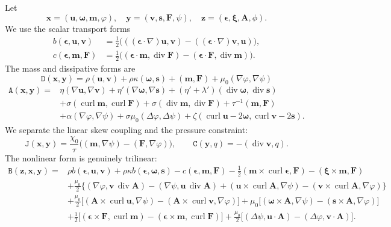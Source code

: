 \documentclass[11pt,a4paper]{article}
\newcommand{\bs}{\boldsymbol}
\DeclareMathOperator{\curl}{curl}
\DeclareMathOperator{\ddiv}{div}
\newcommand{\Div}{\ddiv}
\newcommand{\DD}{\mathtt D}
\newcommand{\Aform}{\mathtt A}
\newcommand{\JJ}{\mathtt J}
\newcommand{\BB}{\mathtt B}
\newcommand{\CC}{\mathtt C}
\theoremstyle{definition}
\numberwithin{equation}{section}
\begin{document}
Let
\[
 \bs x=(\bs u,\bs\omega,\bs m,\varphi),\quad
 \bs y=(\bs v,\bs s,\bs F,\psi),\quad
 \bs z=(\bs\epsilon,\bs \xi,\bs A,\phi).
\]
We use the scalar transport forms
\begin{align}
 b(\bs\epsilon,\bs u,\bs v)
 &=\frac12\bigl(((\bs\epsilon\cdot\nabla)\bs u,\bs v)
                  -((\bs\epsilon\cdot\nabla)\bs v,\bs u)\bigr),\label{eq:b}\\
 c(\bs\epsilon,\bs m,\bs F)
 &=\frac12\bigl((\bs\epsilon\cdot\bs m,\Div\bs F)
                  -(\bs\epsilon\cdot\bs F,\Div\bs m)\bigr).\label{eq:c}
\end{align}
The mass and dissipative forms are
%
\begin{equation}\label{eq:D}
 \DD(\bs x,\bs y)=\rho(\bs u,\bs v)+\rho\kappa(\bs\omega,\bs s)
 +(\bs m,\bs F)+\mu_0(\nabla\varphi,\nabla\psi)
\end{equation}
\begin{equation}\label{eq:A}
\begin{aligned}
 \Aform(\bs x,\bs y)={}&\eta(\nabla\bs u,\nabla\bs v)
 +\eta'(\nabla\bs\omega,\nabla\bs s)
 +(\eta'+\lambda')(\Div\bs\omega,\Div\bs s)\\
 &+\sigma(\curl\bs m,\curl\bs F)+\sigma(\Div\bs m,\Div\bs F)
 +\tau^{-1}(\bs m,\bs F)\\
 &+\alpha(\nabla\varphi,\nabla\psi)+\sigma\mu_0(\Delta\varphi,\Delta\psi)
 +\zeta(\curl\bs u-2\bs\omega,\curl\bs v-2\bs s).
\end{aligned}
\end{equation}
We separate the linear skew coupling and the pressure constraint:
\begin{equation}\label{eq:J-C}
 \JJ(\bs x,\bs y)=\frac{\chi_0}{\tau}\bigl((\bs m,\nabla\psi)-(\bs F,\nabla\varphi)\bigr),
 \qquad \CC(\bs y,q)=-(\Div\bs v,q).
\end{equation}
The nonlinear form is genuinely trilinear:
\begin{equation}\label{eq:B}
\begin{aligned}
 \BB(\bs z,\bs x,\bs y)={}&\rho b(\bs\epsilon,\bs u,\bs v)
 +\rho\kappa b(\bs\epsilon,\bs\omega,\bs s)-c(\bs\epsilon,\bs m,\bs F)-\tfrac12(\bs m\times\curl\bs\epsilon,\bs F)-(\bs \xi\times\bs m,\bs F)\\
 &+\tfrac{\mu_0}{2}\bigl\{(\nabla\varphi,\bs v\,\Div\bs A)
                         -(\nabla\psi,\bs u\,\Div\bs A) + (\bs u\times\curl\bs A,\nabla\psi)
                         -(\bs v\times\curl\bs A,\nabla\varphi)\bigr\}\\
 &+\tfrac{\mu_0}{2}\bigl[(\bs A\times\curl\bs u,\nabla\psi)
                         -(\bs A\times\curl\bs v,\nabla\varphi)\bigr] +\mu_0\bigl[(\bs\omega\times\bs A,\nabla\psi)
                    -(\bs s\times\bs A,\nabla\varphi)\bigr]\\
 &+\tfrac12\bigl[(\bs\epsilon\times\bs F,\curl\bs m)
                      -(\bs\epsilon\times\bs m,\curl\bs F)\bigr]+\tfrac{\mu_0}{2}\bigl[(\Delta\psi,\bs u\cdot\bs A)
                         -(\Delta\varphi,\bs v\cdot\bs A)\bigr].
\end{aligned}
\end{equation}
\end{document}
